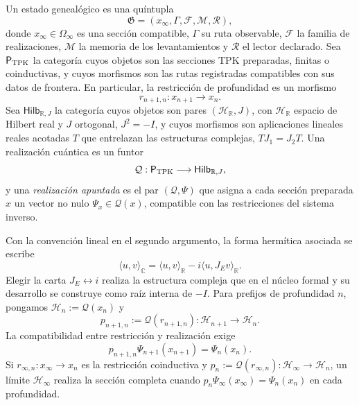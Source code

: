 \begin{definition}
\label{v:v:rec:realizacion_evolucion:statement:01}
Un estado genealógico es una quíntupla
\begin{equation}
 \mathfrak G=(x_\infty,\Gamma,\mathcal F,\mathcal M,\mathcal R),
 \label{v:v:rec:eq:estado-genealogico-realizado-rev2}
\end{equation}
donde \(x_\infty\in\Omega_\infty\) es una sección compatible,
\(\Gamma\) su ruta observable, \(\mathcal F\) la familia de realizaciones,
\(\mathcal M\) la memoria de los levantamientos y \(\mathcal R\) el lector
declarado. Sea \(\mathsf P_{\rm TPK}\) la categoría cuyos objetos son las
secciones TPK preparadas, finitas o coinductivas, y cuyos morfismos son las
rutas registradas compatibles con sus datos de frontera. En particular, la
restricción de profundidad es un morfismo
\[
 r_{n+1,n}:x_{n+1}\longrightarrow x_n.
\]
Sea \(\mathsf{Hilb}_{\mathbb R,J}\) la categoría cuyos objetos
son pares \((\mathcal H_{\mathbb R},J)\), con \(\mathcal H_{\mathbb R}\)
espacio de Hilbert real y \(J\) ortogonal, \(J^2=-I\), y cuyos morfismos son
aplicaciones lineales reales acotadas \(T\) que entrelazan las estructuras
complejas, \(TJ_1=J_2T\). Una realización cuántica es un funtor
\[
 \mathcal Q:\mathsf P_{\rm TPK}\longrightarrow
 \mathsf{Hilb}_{\mathbb R,J},
\]
y una \emph{realización apuntada} es el par \((\mathcal Q,\Psi)\) que asigna
a cada sección preparada \(x\) un vector no nulo
\(\Psi_x\in\mathcal Q(x)\), compatible con las restricciones del sistema
inverso.
\end{definition}

Con la convención lineal en el segundo argumento, la forma hermítica asociada
se escribe
\[
 \langle u,v\rangle_{\mathbb C}
 =\langle u,v\rangle_{\mathbb R}
  -i\langle u,J_E v\rangle_{\mathbb R}.
\]
Elegir la carta \(J_E\leftrightarrow i\) realiza la estructura compleja que
en el núcleo formal y su desarrollo se construye como raíz interna de \(-I\). Para prefijos de
profundidad \(n\), pongamos
\(\mathcal H_n:=\mathcal Q(x_n)\) y
\[
 p_{n+1,n}:=\mathcal Q(r_{n+1,n}):
 \mathcal H_{n+1}\longrightarrow\mathcal H_n.
\]
La compatibilidad entre restricción y realización exige
\begin{equation}
 p_{n+1,n}\Psi_{n+1}(x_{n+1})=\Psi_n(x_n).
 \label{v:v:rec:eq:compatibilidad-realizacion-hilbert-rev2}
\end{equation}
Si \(r_{\infty,n}:x_\infty\to x_n\) es la restricción coinductiva y
\(p_n:=\mathcal Q(r_{\infty,n}):\mathcal H_\infty\to\mathcal H_n\), un
límite \(\mathcal H_\infty\) realiza la sección completa cuando
\(p_n\Psi_\infty(x_\infty)=\Psi_n(x_n)\) en cada profundidad.

